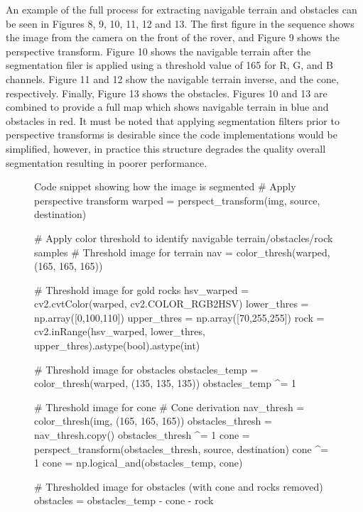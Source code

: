 \documentclass[a4paper]{article}
\begin{document}
An example of the full process for extracting navigable terrain and obstacles can be seen in Figures 8, 9, 10, 11, 12 and 13. The first figure in the sequence shows the image from the camera on the front of the rover, and Figure 9 shows the perspective transform. Figure 10 shows the navigable terrain after the segmentation filer is applied using a threshold value of 165 for R, G, and B channels. Figure 11 and 12 show the navigable terrain inverse, and the cone, respectively. Finally, Figure 13 shows the obstacles. Figures 10 and 13 are combined to provide a full map which shows navigable terrain in blue and obstacles in red. It must be noted that applying segmentation filters prior to perspective transforms is desirable since the code implementations would be simplified, however, in practice this structure degrades the quality overall segmentation resulting in poorer performance.\\

\vspace{1cm}

\begin{figure}[h]\scriptsize
\begin{sexylisting}{Code snippet showing how the image is segmented}
# Apply perspective transform
warped = perspect_transform(img, source, destination)
    
# Apply color threshold to identify navigable terrain/obstacles/rock samples
# Threshold image for terrain
nav = color_thresh(warped, (165, 165, 165))
    
# Threshold image for gold rocks
hsv_warped = cv2.cvtColor(warped, cv2.COLOR_RGB2HSV)
lower_thres = np.array([0,100,110])
upper_thres = np.array([70,255,255])
rock = cv2.inRange(hsv_warped, lower_thres, upper_thres).astype(bool).astype(int)
    
# Threshold image for obstacles
obstacles_temp = color_thresh(warped, (135, 135, 135))
obstacles_temp ^= 1
    
# Threshold image for cone
# Cone derivation
nav_thresh = color_thresh(img, (165, 165, 165))
obstacles_thresh = nav_thresh.copy()
obstacles_thresh ^= 1
cone = perspect_transform(obstacles_thresh, source, destination)
cone ^= 1
cone = np.logical_and(obstacles_temp, cone)
    
# Thresholded image for obstacles (with cone and rocks removed)
obstacles = obstacles_temp - cone - rock
\end{sexylisting}
\end{figure}
\end{document}
